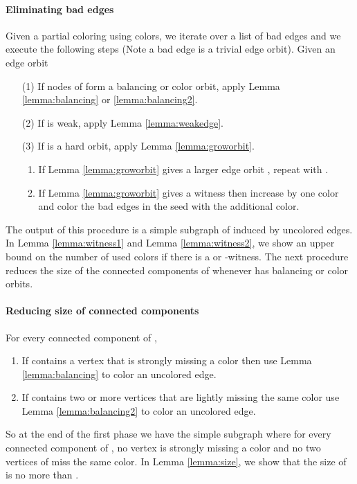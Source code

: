 \documentclass[titlepage, 11pt]{article}
\begin{document}
\paragraph{Eliminating bad edges}
\label{sec:bad}
Given a partial coloring using  colors, we iterate over a list of bad edges and we execute the following steps (Note a bad edge is a trivial edge orbit).
Given an edge orbit  
\begin{enumerate}
\item[(1)] If nodes of  form a balancing or color orbit, 
apply Lemma \ref{lemma:balancing} or \ref{lemma:balancing2}.
\item[(2)] If  is weak, apply Lemma \ref{lemma:weakedge}.
\item[(3)] If  is a hard orbit, apply Lemma \ref{lemma:groworbit}.
\begin{enumerate}
\item If Lemma \ref{lemma:groworbit} gives a larger edge orbit , repeat with .
\item If Lemma \ref{lemma:groworbit} gives a witness then increase  by one color and color the bad edges in the seed with the additional color.
\end{enumerate}
\end{enumerate}
\vspace{11 pt}
The output of this procedure is a simple subgraph  of  induced by uncolored edges. 
In Lemma \ref{lemma:witness1} and Lemma \ref{lemma:witness2},
we show an upper bound on the number of used colors if there is a  or -witness. The next procedure reduces the size of the connected components of  whenever  has balancing or color orbits.

\paragraph{Reducing size of connected components}
\label{sec:size}
For every connected component  of , 
\begin{enumerate}
\item If  contains a vertex that is strongly missing a color then use Lemma \ref{lemma:balancing} to color an uncolored edge.
\item If  contains two or more vertices that are lightly missing the same color use Lemma \ref{lemma:balancing2} to color an uncolored edge.
\end{enumerate}
So at the end of the first phase we have the simple subgraph  where for every connected component  of ,
 no vertex is strongly missing a color and no two vertices of  miss the same color. 
 In Lemma \ref{lemma:size}, we show that the size of  is no more than .
\end{document}
